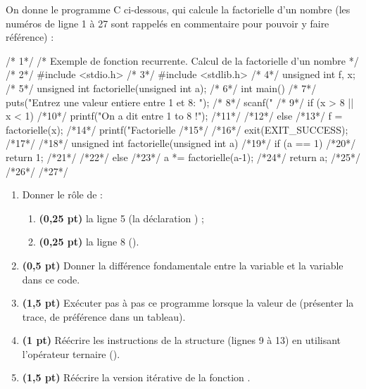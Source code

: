 \noindent On donne le programme C ci-dessous, qui calcule la factorielle d'un nombre (les
numéros de ligne 1 à 27 sont rappelés en commentaire pour pouvoir y faire référence) :

\begin{codec}
/* 1*/  /* Exemple de fonction recurrente. Calcul de la factorielle d'un nombre */
/* 2*/  #include <stdio.h>
/* 3*/  #include <stdlib.h>
/* 4*/  unsigned int f, x;
/* 5*/  unsigned int factorielle(unsigned int a);
/* 6*/  int main() {
/* 7*/      puts("Entrez une valeur entiere entre 1 et 8: ");
/* 8*/      scanf("%
/* 9*/      if (x > 8 || x < 1) {
/*10*/          printf("On a dit entre 1 to 8 !");
/*11*/      }
/*12*/      else {
/*13*/          f = factorielle(x);
/*14*/          printf("Factorielle %
/*15*/      }
/*16*/      exit(EXIT_SUCCESS);
/*17*/  }
/*18*/  unsigned int factorielle(unsigned int a) {
/*19*/      if (a == 1) {
/*20*/          return 1;
/*21*/      }
/*22*/      else {
/*23*/          a *= factorielle(a-1);
/*24*/          return a;
/*25*/      }
/*26*/  }
/*27*/
\end{codec}

\begin{enumerate}[label=\textbf{\arabic*.}]
\item Donner le rôle de :
  \begin{enumerate}[label=\textbf{1.\arabic*}]
  \item \textbf{(0,25 pt)} la ligne 5 (la déclaration ) ;
  \item \textbf{(0,25 pt)} la ligne 8 ().
  \end{enumerate}
\item \textbf{(0,5 pt)} Donner la différence fondamentale entre la variable  et la
variable  dans ce code.
\item \textbf{(1,5 pt)} Exécuter pas à pas ce programme lorsque la valeur de 
(présenter la trace, de préférence dans un tableau).
\item \textbf{(1 pt)} Réécrire les instructions de la structure  (lignes 9 à 13)
en utilisant l'opérateur ternaire ().
\item \textbf{(1,5 pt)} Réécrire la version itérative de la fonction .
\end{enumerate}


